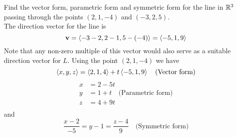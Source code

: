 \documentclass[handout]{ximera}
\begin{document}
\begin{example}
Find the vector form, parametric form and symmetric form for the line in $\mathbb R^3$ passing through the points $(2, 1, -4)$ and $(-3, 2, 5)$.\\
The direction vector for the line is 
\[
\mathbf{v} = \left\langle -3-2, 2-1, 5-(-4)\right\rangle = \left\langle -5, 1, 9\right\rangle
\]
Note that any non-zero multiple of this vector would also serve as a suitable direction vector for $L$. Using the point $(2, 1, -4)$ we have
\[
\left\langle x, y, z\right\rangle = \left\langle 2, 1, 4\right\rangle + t\left\langle -5, 1, 9\right\rangle \quad \text{(Vector form)}
\]
\begin{align*}
x &= 2 -5t\\
y &= 1 + t \quad\text{(Parametric form)}\\
z &= 4 + 9t\\
\end{align*}
and
\[
\frac{x-2}{-5} = y-1 = \frac{z-4}{9} \quad \text{(Symmetric form)}
\]
\end{example}
\end{document}
